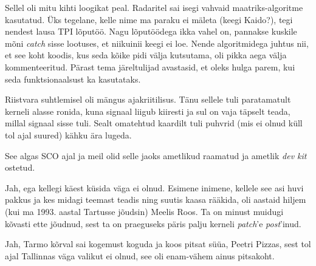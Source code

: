 
Sellel oli mitu kihti loogikat peal. Radaritel sai isegi 
vahvaid maatriks-algoritme kasutatud. Üks tegelane, kelle nime ma 
paraku ei mäleta (keegi Kaido?), tegi nendest lausa TPI 
lõputöö. Nagu lõputöödega ikka vahel on, pannakse kuskile mõni
\emph{catch} sisse lootuses, et niikuinii keegi ei loe. Nende algoritmidega 
juhtus nii, et see koht koodis, kus seda kõike pidi 
välja kutsutama, oli pikka aega välja kommenteeritud. Pärast tema järeltulijad 
avastasid, et oleks hulga parem, kui seda funktsionaalsust ka
kasutataks.


Riistvara suhtlemisel oli mängus ajakriitilisus. Tänu sellele tuli paratamatult kerneli alasse ronida, kuna signaal liigub kiiresti ja sul on vaja täpselt 
teada, millal signaal sisse tuli. Sealt omatehtud kaardilt tuli 
puhvrid (mis ei olnud küll tol ajal suured) kähku ära lugeda.


See algas SCO ajal ja meil olid selle jaoks
ametlikud raamatud ja ametlik \emph{dev kit} ostetud.


Jah, ega kellegi käest küsida väga ei olnud. Esimene inimene, kellele see asi 
huvi pakkus ja kes midagi teemast teadis ning suutis kaasa rääkida, oli 
aastaid hiljem (kui ma 1993. aastal Tartusse jõudsin) Meelis 
Roos. Ta on minust muidugi kõvasti ette jõudnud, 
sest ta on praeguseks päris palju kerneli \emph{patch}'e \emph{post}'inud. 


Jah, Tarmo kõrval sai kogemust koguda ja koos 
pitsat süüa, Peetri Pizzas, sest tol ajal Tallinnas väga valikut ei 
olnud, see oli enam-vähem ainus pitsakoht. 


